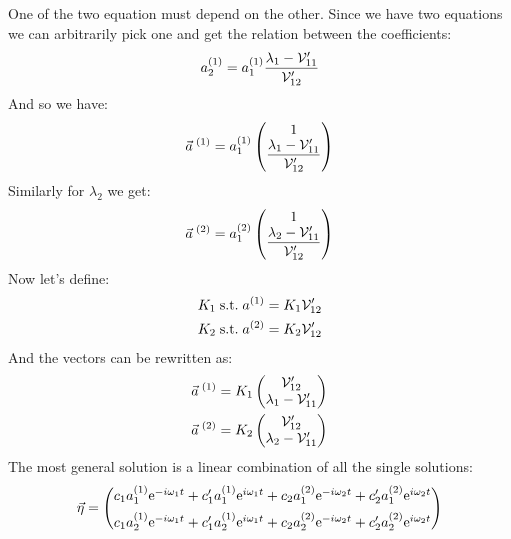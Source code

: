One of the two equation must depend on the other. Since we have two equations we can arbitrarily pick one and get the relation between the coefficients:
\begin{equation}
    a_2^{(1)} = a_1^{(1)}\dfrac{\lambda_1 - \mathcal{V}'_{11}}{\mathcal{V}'_{12}}
\end{equation}
And so we have:
\begin{equation}
    \vec{a}^{\;(1)} = a_1^{(1)}\begin{pmatrix}
        1 \\ \dfrac{\lambda_1 - \mathcal{V}'_{11}}{\mathcal{V}'_{12}}
    \end{pmatrix}
\end{equation}
Similarly for $\lambda_2$ we get:
\begin{equation}
    \vec{a}^{\;(2)} = a_1^{(2)}\begin{pmatrix}
        1 \\ \dfrac{\lambda_2 - \mathcal{V}'_{11}}{\mathcal{V}'_{12}}
    \end{pmatrix}
\end{equation}
Now let's define:
\begin{equation}
    \begin{split}
        K_1\;\text{s.t.}\; a^{(1)} = K_1\mathcal{V}'_{12}\\
        K_2\;\text{s.t.}\; a^{(2)} = K_2\mathcal{V}'_{12}
    \end{split}
\end{equation}
And the vectors can be rewritten as:
\begin{equation}
    \begin{split}
        \vec{a}^{\;(1)} = K_1\begin{pmatrix}
            \mathcal{V}'_{12} \\ \lambda_1 - \mathcal{V}'_{11}
        \end{pmatrix}\\
        \vec{a}^{\;(2)} = K_2\begin{pmatrix}
            \mathcal{V}'_{12} \\ \lambda_2 - \mathcal{V}'_{11}
        \end{pmatrix}
    \end{split}
\end{equation}
The most general solution is a linear combination of all the single solutions:
\begin{equation}
    \vec{\eta} = \begin{pmatrix}
        c_1 a_1^{(1)}\mathrm{e}^{-i\omega_1 t} + c_1' a_1^{(1)}\mathrm{e}^{i\omega_1 t} + c_2 a_1^{(2)}\mathrm{e}^{-i\omega_2 t} + c_2' a_1^{(2)}\mathrm{e}^{i\omega_2 t}\\[5pt]
        c_1 a_2^{(1)}\mathrm{e}^{-i\omega_1 t} + c_1' a_2^{(1)}\mathrm{e}^{i\omega_1 t} + c_2 a_2^{(2)}\mathrm{e}^{-i\omega_2 t} + c_2' a_2^{(2)}\mathrm{e}^{i\omega_2 t}
    \end{pmatrix}
\end{equation}
